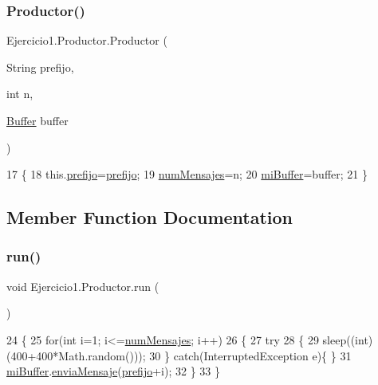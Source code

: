 \subsubsection{\texorpdfstring{Productor()}{Productor()}}
{\footnotesize\ttfamily Ejercicio1.\+Productor.\+Productor (\begin{DoxyParamCaption}\item[{String}]{prefijo,  }\item[{int}]{n,  }\item[{\mbox{\hyperlink{class_ejercicio1_1_1_buffer}{Buffer}}}]{buffer }\end{DoxyParamCaption})\hspace{0.3cm}{\ttfamily [inline]}}


\begin{DoxyCode}
17     \{
18         this.\mbox{\hyperlink{class_ejercicio1_1_1_productor_acb123e6d77ab635083f54d0bfbf368f3}{prefijo}}=\mbox{\hyperlink{class_ejercicio1_1_1_productor_acb123e6d77ab635083f54d0bfbf368f3}{prefijo}};
19         \mbox{\hyperlink{class_ejercicio1_1_1_productor_a0f56bcdbff4615909a80c795a7cc6d29}{numMensajes}}=n;
20         \mbox{\hyperlink{class_ejercicio1_1_1_productor_a539d67b6a5922a08d6511ff2721ac4b6}{miBuffer}}=buffer;
21     \}
\end{DoxyCode}


\subsection{Member Function Documentation}
\mbox{\label{class_ejercicio1_1_1_productor_ad45443cc9192f1f43c109b36b28ea003}} 
\subsubsection{\texorpdfstring{run()}{run()}}
{\footnotesize\ttfamily void Ejercicio1.\+Productor.\+run (\begin{DoxyParamCaption}{ }\end{DoxyParamCaption})\hspace{0.3cm}{\ttfamily [inline]}}


\begin{DoxyCode}
24     \{
25         \textcolor{keywordflow}{for}(\textcolor{keywordtype}{int} i=1; i<=\mbox{\hyperlink{class_ejercicio1_1_1_productor_a0f56bcdbff4615909a80c795a7cc6d29}{numMensajes}}; i++)
26         \{
27             \textcolor{keywordflow}{try}
28             \{
29                 sleep((\textcolor{keywordtype}{int})(400+400*Math.random()));
30             \} \textcolor{keywordflow}{catch}(InterruptedException e)\{  \}
31             \mbox{\hyperlink{class_ejercicio1_1_1_productor_a539d67b6a5922a08d6511ff2721ac4b6}{miBuffer}}.\mbox{\hyperlink{class_ejercicio1_1_1_buffer_ae8a567959dc32c3965d89f487e2b889f}{enviaMensaje}}(\mbox{\hyperlink{class_ejercicio1_1_1_productor_acb123e6d77ab635083f54d0bfbf368f3}{prefijo}}+i);
32         \}
33     \}
\end{DoxyCode}


